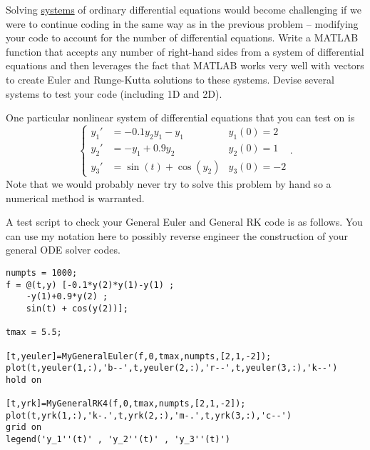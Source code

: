 \begin{problem}
    Solving \underline{systems} of ordinary differential equations would become challenging if we were
    to continue coding in the same way as in the previous problem -- modifying your code
    to account for the number of differential equations. Write a MATLAB function
    that accepts any number of right-hand sides from a system of differential equations
    and then leverages the fact that MATLAB works very well with vectors to create Euler
    and Runge-Kutta solutions to these systems. Devise several systems to test your code
    (including 1D and 2D).

    One particular nonlinear system of differential equations that you can test on is
    \[ \left\{ \begin{array}{rlc} y_1' &= -0.1y_2 y_1 - y_1 & y_1(0) = 2 \\
            y_2' &= -y_1 + 0.9y_2 & y_2(0) = 1 \\
        y_3' &= \sin(t)+ \cos(y_2) & y_3(0)=-2 \end{array} \right.. \]
    Note that we would probably never try to solve this problem by hand so a numerical
    method is warranted.

    A test script to check your General Euler and General RK code is as follows.  You can
    use my notation here to possibly reverse engineer the construction of your general ODE
    solver codes.
\begin{lstlisting}
numpts = 1000;
f = @(t,y) [-0.1*y(2)*y(1)-y(1) ; 
    -y(1)+0.9*y(2) ; 
    sin(t) + cos(y(2))];

tmax = 5.5;

[t,yeuler]=MyGeneralEuler(f,0,tmax,numpts,[2,1,-2]);
plot(t,yeuler(1,:),'b--',t,yeuler(2,:),'r--',t,yeuler(3,:),'k--')
hold on

[t,yrk]=MyGeneralRK4(f,0,tmax,numpts,[2,1,-2]);
plot(t,yrk(1,:),'k-.',t,yrk(2,:),'m-.',t,yrk(3,:),'c--')
grid on
legend('y_1''(t)' , 'y_2''(t)' , 'y_3''(t)')
\end{lstlisting}
\end{problem}




